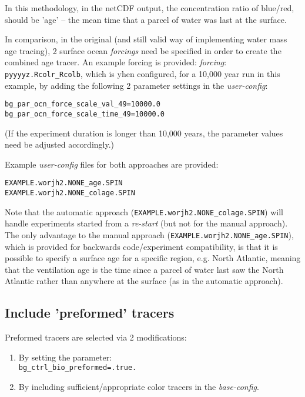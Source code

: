 \documentclass[11pt,fleqn]{book} %
\begin{document}
In this methodology, in the netCDF output, the concentration ratio of blue/red, should be 'age' -- the mean time that a parcel of water was last at the surface.

In comparison, in the original (and still valid way of implementing water mass age tracing), 2 surface ocean \textit{forcings} need be specified in order to create the combined age tracer. An example forcing is provided: \textit{forcing}: \texttt{pyyyyz.Rcolr\_Rcolb}, which is yhen configured, for a 10,000 year run in this example, by adding the following 2 parameter settings in the \textit{user-config}:
\vspace{-2pt}\begin{verbatim}
bg_par_ocn_force_scale_val_49=10000.0
bg_par_ocn_force_scale_time_49=10000.0
\end{verbatim}\vspace{-2pt}

\noindent (If the experiment duration is longer than 10,000 years, the parameter values need be adjusted accordingly.)


Example \textit{user-config} files for both approaches are provided: 
\vspace{-2pt}\begin{verbatim}
EXAMPLE.worjh2.NONE_age.SPIN
EXAMPLE.worjh2.NONE_colage.SPIN
\end{verbatim}\vspace{-2pt}

\noindent Note that the automatic approach (\texttt{EXAMPLE.worjh2.NONE\_colage.SPIN}) will handle experiments started from a \textit{re-start} (but not for the manual approach). The only advantage to the manual approach (\texttt{EXAMPLE.worjh2.NONE\_age.SPIN}), which is provided for backwards code/experiment compatibility, is that it is possible to specify a surface age for a specific region, e.g. North Atlantic, meaning that the ventilation age is the time since a parcel of water last saw the North Atlantic rather than anywhere at the surface (as in the automatic approach).

%
\subsection*{Include 'preformed' tracers}
\vspace{1mm}

Preformed tracers are selected via 2 modifications:

\vspace{2mm}
\begin{enumerate}
\vspace{1mm}
\item By setting the parameter:
\\\texttt{bg\_ctrl\_bio\_preformed=.true.}
\vspace{1mm}
\item By including sufficient/appropriate color tracers in the \textit{base-config}.
\end{enumerate}
\vspace{2mm}
\end{document}
